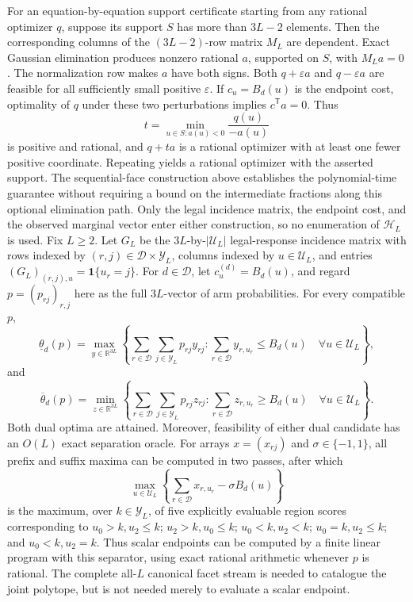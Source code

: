 For an equation-by-equation support certificate starting from any rational optimizer \(q\), suppose its support \(S\) has more than \(3L-2\) elements.  Then the corresponding columns of the \((3L-2)\)-row matrix \(M_L\) are dependent.  Exact Gaussian elimination produces nonzero rational \(a\), supported on \(S\), with \(M_La=0\).  The normalization row makes \(a\) have both signs.  Both \(q+\varepsilon a\) and \(q-\varepsilon a\) are feasible for all sufficiently small positive \(\varepsilon\).  If \(c_u=B_d(u)\) is the endpoint cost, optimality of \(q\) under these two perturbations implies \(c^{\mathsf T}a=0\).  Thus
\[
 t=\min_{u\in S:a(u)<0}\frac{q(u)}{-a(u)}
\]
is positive and rational, and \(q+ta\) is a rational optimizer with at least one fewer positive coordinate.  Repeating yields a rational optimizer with the asserted support.  The sequential-face construction above establishes the polynomial-time guarantee without requiring a bound on the intermediate fractions along this optional elimination path.  Only the legal incidence matrix, the endpoint cost, and the observed marginal vector enter either construction, so no enumeration of \(\mathcal H_L\) is used.
Fix \(L\ge2\).  Let \(G_L\) be the \(3L\)-by-\(|\mathcal U_L|\) legal-response incidence matrix with rows indexed by \((r,j)\in\mathcal D\times\mathcal Y_L\), columns indexed by \(u\in\mathcal U_L\), and entries \((G_L)_{(r,j),u}=\mathbf 1\{u_r=j\}\).  For \(d\in\mathcal D\), let \(c^{(d)}_u=B_d(u)\), and regard \(p=(p_{rj})_{r,j}\) here as the full \(3L\)-vector of arm probabilities.  For every compatible \(p\),
\[
 \underline\theta_d(p)=
 \max_{y\in\mathbb R^{3L}}
 \left\{\sum_{r\in\mathcal D}\sum_{j\in\mathcal Y_L}p_{rj}y_{rj}:
 \sum_{r\in\mathcal D}y_{r,u_r}\le B_d(u)\quad\forall u\in\mathcal U_L\right\},
\]
and
\[
 \overline\theta_d(p)=
 \min_{z\in\mathbb R^{3L}}
 \left\{\sum_{r\in\mathcal D}\sum_{j\in\mathcal Y_L}p_{rj}z_{rj}:
 \sum_{r\in\mathcal D}z_{r,u_r}\ge B_d(u)\quad\forall u\in\mathcal U_L\right\}.
\]
Both dual optima are attained.  Moreover, feasibility of either dual candidate has an \(O(L)\) exact separation oracle.  For arrays \(x=(x_{rj})\) and \(\sigma\in\{-1,1\}\), all prefix and suffix maxima can be computed in two passes, after which
\[
 \max_{u\in\mathcal U_L}\left\{\sum_{r\in\mathcal D}x_{r,u_r}-\sigma B_d(u)\right\}
\]
is the maximum, over \(k\in\mathcal Y_L\), of five explicitly evaluable region scores corresponding to \(u_0>k,u_2\le k\); \(u_2>k,u_0\le k\); \(u_0<k,u_2<k\); \(u_0=k,u_2\le k\); and \(u_0<k,u_2=k\).  Thus scalar endpoints can be computed by a finite linear program with this separator, using exact rational arithmetic whenever \(p\) is rational.  The complete all-\(L\) canonical facet stream is needed to catalogue the joint polytope, but is not needed merely to evaluate a scalar endpoint.
